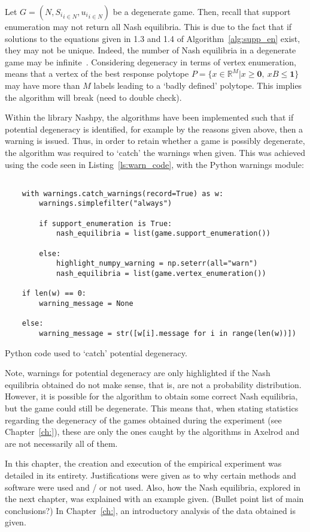 Let \(G = (N, {S_{i}}_{i \in N}, {u_{i}}_{i \in N})\) be a degenerate game.
Then, recall that support enumeration may not return all Nash equilibria. This
is due to the fact that if solutions to the equations given in 1.3 and 1.4 of
Algorithm~\ref{alg:supp_en} exist, they may not be unique. Indeed, the number of
Nash equilibria in a degenerate game may be infinite~\cite{NoamNisan2007}.
Considering degeneracy in terms of vertex enumeration, means that a vertex of
the best response polytope \(P = \{x \in \mathbb{R}^{M} | x \ge \textbf{0}, ~ xB
\le \textbf{1}\}\) may have more than \(M\) labels leading to a `badly defined'
polytope. This implies the algorithm will break (need to double check).

Within the library Nashpy, the algorithms have been implemented such that if
potential degeneracy is identified, for example by the reasons given above, then
a warning is issued. Thus, in order to retain whether a game is possibly
degenerate, the algorithm was required to `catch' the warnings when given. This
was achieved using the code seen in Listing~\ref{ls:warn_code}, with the Python warnings module:
\begin{listing}
    \begin{verbatim}
    
    with warnings.catch_warnings(record=True) as w:
        warnings.simplefilter("always")

        if support_enumeration is True:
            nash_equilibria = list(game.support_enumeration())

        else:
            highlight_numpy_warning = np.seterr(all="warn")
            nash_equilibria = list(game.vertex_enumeration())

    if len(w) == 0:
        warning_message = None

    else:
        warning_message = str([w[i].message for i in range(len(w))])

    \end{verbatim}
    \caption{Python code used to `catch' potential degeneracy.}\label{ls:warn_code}
\end{listing}

Note, warnings for potential degeneracy are only highlighted if the
Nash equilibria obtained do not make sense, that is, are not a probability
distribution. However, it is possible for the algorithm to obtain some correct
Nash equilibria, but the game could still be degenerate. This means that, when
stating statistics regarding the degeneracy of the games obtained during the
experiment (see Chapter~\ref{ch:}), these are only the ones caught by the
algorithms in Axelrod and are not necessarily all of them.


In this chapter, the creation and execution of the empirical experiment was
detailed in its entirety. Justifications were given as to why certain methods
and software were used and / or not used. Also, how the Nash equilibria,
explored in the next chapter, was explained with an example given. (Bullet point
list of main conclusions?) In Chapter~\ref{ch:}, an introductory analysis of the
data obtained is given.